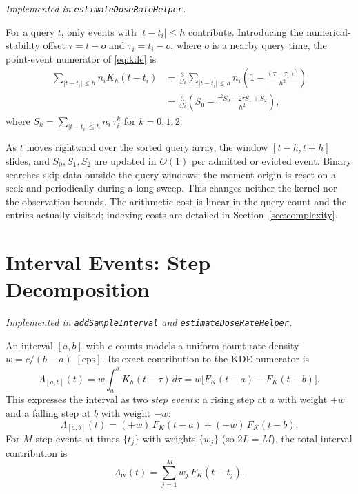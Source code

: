 \documentclass[11pt,a4paper]{article}
\newcommand{\h}{h}                   %
\begin{document}
\noindent\textit{Implemented in \texttt{estimateDoseRateHelper}.}

\medskip\noindent
For a query $t$, only events with $|t - t_i| \le \h$ contribute.  Introducing
the numerical-stability offset $\tau = t - o$ and
$\tau_i = t_i - o$, where $o$ is a nearby query time, the point-event numerator of
\eqref{eq:kde} is
\begin{align}
  \sum_{|t-t_i|\le\h} n_i K_\h(t-t_i)
  &= \frac{3}{4\h}\sum_{|t-t_i|\le\h} n_i\!\left(1 - \frac{(\tau-\tau_i)^2}{\h^2}\right)
  \nonumber\\
  &= \frac{3}{4\h}\!\left(S_0 - \frac{\tau^2 S_0 - 2\tau S_1 + S_2}{\h^2}\right),
  \label{eq:pointsum}
\end{align}
where $S_k = \sum_{|t-t_i|\le\h} n_i\,\tau_i^k$ for $k=0,1,2$.

As $t$ moves rightward over the sorted query array, the window $[t-\h, t+\h]$
slides, and $S_0, S_1, S_2$ are updated in $O(1)$ per admitted or evicted
event.  Binary searches skip data outside the query windows; the moment
origin is reset on a seek and periodically during a long sweep.  This
changes neither the kernel nor the observation bounds.  The arithmetic
cost is linear in the query count and the entries actually visited;
indexing costs are detailed in Section~\ref{sec:complexity}.

\section{Interval Events: Step Decomposition}
\label{sec:intervals}

\noindent\textit{Implemented in \texttt{addSampleInterval} and
\texttt{estimateDoseRateHelper}.}

\medskip\noindent
An interval $[a, b]$ with $c$ counts models a uniform count-rate density
$w = c/(b-a)$ $[\mathrm{cps}]$.  Its exact contribution to the KDE numerator
is
\begin{equation}
  \Lambda_{[a,b]}(t) = w\int_a^b K_\h(t-\tau)\,d\tau
                     = w\bigl[F_K(t-a) - F_K(t-b)\bigr].
  \label{eq:ivContrib}
\end{equation}
This expresses the interval as two \emph{step events}: a rising step at $a$
with weight $+w$ and a falling step at $b$ with weight $-w$:
\begin{equation}
  \Lambda_{[a,b]}(t) = (+w)\,F_K(t - a) + (-w)\,F_K(t - b).
  \label{eq:stepDecomp}
\end{equation}
For $M$ step events at times $\{t_j\}$ with weights $\{w_j\}$ (so $2L = M$),
the total interval contribution is
\begin{equation}
  \Lambda_{\mathrm{iv}}(t) = \sum_{j=1}^{M} w_j\, F_K(t - t_j).
  \label{eq:ivTotal}
\end{equation}
\end{document}
